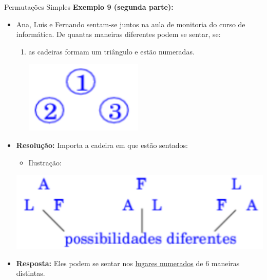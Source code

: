 \documentclass[aspectratio=169]{beamer}
\begin{document}
\begin{frame}{Permutações Simples}
    \textbf{Exemplo 9 (segunda parte):}

    \vspace{2mm}

    \begin{itemize}
        \item[] Ana, Luis e Fernando sentam-se juntos na aula de monitoria do curso de informática. De quantas maneiras diferentes podem se sentar, se:
        \begin{enumerate}[(2)]
            \item as cadeiras formam um triângulo e estão numeradas.
            \begin{center}
                \includegraphics[width=0.1\linewidth]{figs/Exemplo9_2.png}
            \end{center}
        \end{enumerate}

        \pause 
        \item[] \textbf{Resolução:} Importa a cadeira em que estão sentados:
        \begin{itemize}
            \item[] Ilustração:
        \end{itemize}
        \begin{center}
            \includegraphics[width=0.4\linewidth]{figs/Exemplo9_4.png}
        \end{center}

        \pause
        \item[] \textbf{Resposta:} Eles podem se sentar nos \underline{lugares numerados} de 6 maneiras distintas.
    \end{itemize}
\end{frame}
\end{document}
